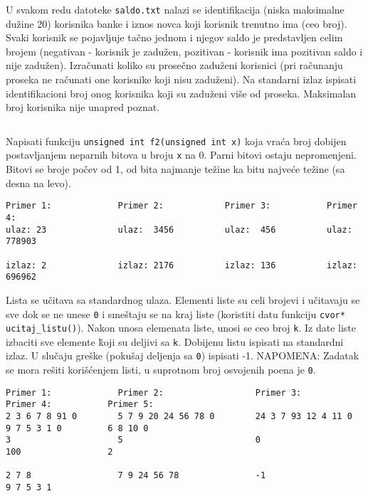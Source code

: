 \begin{z}
U svakom redu datoteke \verb|saldo.txt| nalazi se identifikacija (niska maksimalne du\v zine 20) korisnika banke i iznos novca koji korisnik trenutno ima (ceo broj).
Svaki korisnik se pojavljuje ta\v cno jednom i njegov saldo je predstavljen celim brojem (negativan - korisnik je zadu\v zen,
pozitivan - korisnik ima pozitivan saldo i nije zadu\v zen). Izra\v cunati koliko su prose\v cno
zadu\v zeni korisnici (pri ra\v cunanju proseka ne ra\v cunati one korisnike koji nisu zadu\v zeni).
Na standarni izlaz ispisati identifikacioni broj onog korisnika koji su zadu\v zeni vi\v se od proseka.
Maksimalan broj korisnika nije unapred poznat.
\end{z}
\begin{verbatim}

\end{verbatim}

\begin{z}
Napisati funkciju \verb|unsigned int f2(unsigned int x)| koja vra\' ca broj dobijen postavljanjem
neparnih bitova u broju \verb|x| na 0. Parni bitovi ostaju nepromenjeni. Bitovi se broje po\v cev od 1,
od bita najmanje te\v zine ka bitu najve\'ce te\v zine (sa desna na levo).
\end{z}
\begin{verbatim}
Primer 1:             Primer 2:            Primer 3:           Primer 4:
ulaz: 23              ulaz:  3456          ulaz:  456          ulaz: 778903

izlaz: 2              izlaz: 2176          izlaz: 136          izlaz: 696962
\end{verbatim}


\begin{z}
Lista se u\v citava sa standardnog ulaza. Elementi liste su celi brojevi i u\v citavaju se sve dok se ne
unese {\tt 0} i sme\v staju se na kraj liste (koristiti datu funkciju {\tt cvor* ucitaj\_listu()}).
Nakon unosa elemenata liste, unosi se ceo broj {\tt k}.
Iz date liste izbaciti sve elemente \v koji su deljivi sa {\tt k}.
Dobijenu listu ispisati na standardni izlaz. U slu\v caju gre\v ske (poku\v saj deljenja sa {\tt 0}) ispisati -1.
NAPOMENA: Zadatak se mora re\v siti kori\v s\'cenjem listi, u suprotnom broj osvojenih poena je {\tt 0}.
\end{z}
\begin{verbatim}
Primer 1:             Primer 2:                  Primer 3:                 Primer 4:           Primer 5:
2 3 6 7 8 91 0        5 7 9 20 24 56 78 0        24 3 7 93 12 4 11 0       9 7 5 3 1 0         6 8 10 0
3                     5                          0                         100                 2

2 7 8                 7 9 24 56 78               -1                        9 7 5 3 1
\end{verbatim}

